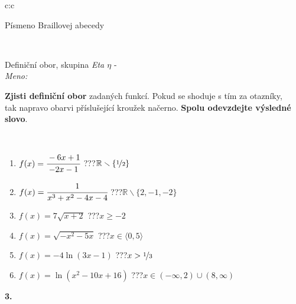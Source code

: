 \documentclass[10pt]{report}
\begin{document}
\begin{tabular}{c:c}
\begin{minipage}[c][104.5mm][t]{0.5\linewidth}
\begin{center}
\begin{minipage}{0.20\linewidth}
\begin{center}
{\small Písmeno Braillovej abecedy}
\end{center}
\end{minipage}
\end{center}
\end{minipage}
\\ \hdashline
\begin{minipage}[c][104.5mm][t]{0.5\linewidth}
\begin{center}
\vspace{7mm}
{\huge Definiční obor, skupina \textit{Eta $\eta$} -}\\[5mm]
\textit{Meno:}\phantom{xxxxxxxxxxxxxxxxxxxxxxxxxxxxxxxxxxxxxxxxxxxxxxxxxxxxxxxxxxxxxxxxx}\\[5mm]
\begin{minipage}{0.95\linewidth}
\textbf{Zjisti definiční obor} zadaných funkcí. Pokud se shoduje s tím za otazníky,\\tak napravo obarvi příslušející kroužek načerno. \textbf{Spolu odevzdejte výsledné slovo}.
\end{minipage}
\\[1mm]
\begin{minipage}{0.79\linewidth}
\begin{center}
\begin{varwidth}{\linewidth}
\begin{enumerate}
\normalsizerrr
\item $f(x)=\cfrac{-6x+1}{-2x-1}$\quad \dotfill\; ???\;\dotfill \quad $\mathbb{R}\smallsetminus\{\nicefrac{1}{2}\}$
\item $f(x)=\cfrac{1}{x^3+x^2-4x-4}$\quad \dotfill\; ???\;\dotfill \quad $\mathbb{R}\smallsetminus\{2,-1,-2\}$
\item $f(x)=7\sqrt{x+2}$\quad \dotfill\; ???\;\dotfill \quad $x\geq-2$
\item $f(x)=\sqrt{-x^2-5x}$\quad \dotfill\; ???\;\dotfill \quad $x\in\langle0 , 5\rangle$
\item $f(x)=-4\ln{(3x-1)}$\quad \dotfill\; ???\;\dotfill \quad $x>\nicefrac{1}{3}$
\item $f(x)=\ln{(x^2-10x+16)}$\quad \dotfill\; ???\;\dotfill \quad $x\in(-\infty , 2)\cup(8 , \infty)$
\end{enumerate}
\end{varwidth}
\end{center}
\end{minipage}
\begin{minipage}{0.20\linewidth}
\begin{center}
{\Huge\bfseries 3.} \\[2mm]

\end{center}
\end{minipage}
\end{center}
\end{minipage}
\end{tabular}
\end{document}
